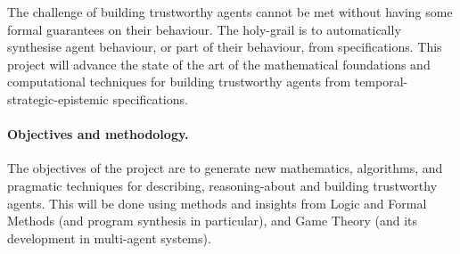 \documentclass[a4paper,12pt,smallheadings]{scrartcl}
\begin{document}

The challenge of building trustworthy agents cannot be met without having some formal guarantees on their 
behaviour. The holy-grail is to automatically synthesise agent behaviour, or part of their behaviour, from 
specifications. This project will advance the state of the art of the mathematical foundations and computational techniques 
for building trustworthy agents from temporal-strategic-epistemic specifications. 






\paragraph{Objectives and methodology.}
The objectives of the project are to generate new mathematics, algorithms, and pragmatic techniques for describing, reasoning-about and building trustworthy  agents. This will be done using methods and insights from Logic and Formal Methods (and program synthesis in particular), and 
Game Theory (and its development in multi-agent systems). 
\end{document}
